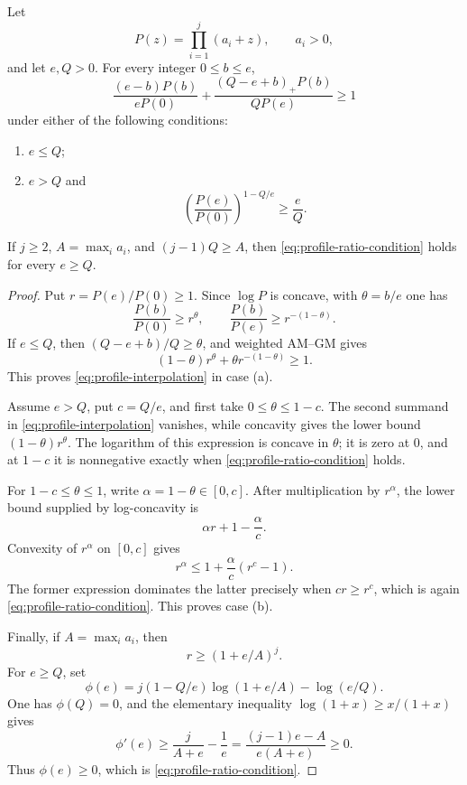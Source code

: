 \documentclass[11pt,a4paper]{amsart}
\numberwithin{equation}{section}
\theoremstyle{remark}
\begin{document}
\begin{lemma}
\label{lem:codim-one-profile-interpolation}
Let
\[
 P(z)=\prod_{i=1}^{j}(a_i+z),\qquad a_i>0,
\]
and let \(e,Q>0\).  For every integer \(0\le b\le e\),
\begin{equation}
 \frac{(e-b)P(b)}{eP(0)}+
 \frac{(Q-e+b)_+P(b)}{QP(e)}\ge1
 \label{eq:profile-interpolation}
\end{equation}
under either of the following conditions:
\begin{enumerate}[label=\textup{(\alph*)},leftmargin=*]
\item \(e\le Q\);
\item \(e>Q\) and
\begin{equation}
 \left(\frac{P(e)}{P(0)}\right)^{1-Q/e}\ge\frac eQ.
 \label{eq:profile-ratio-condition}
\end{equation}
\end{enumerate}
If \(j\ge2\), \(A=\max_i a_i\), and \((j-1)Q\ge A\), then
\eqref{eq:profile-ratio-condition} holds for every \(e\ge Q\).
\end{lemma}

\begin{proof}
Put \(r=P(e)/P(0)\ge1\).  Since \(\log P\) is concave, with
\(\theta=b/e\) one has
\[
 \frac{P(b)}{P(0)}\ge r^\theta,
 \qquad
 \frac{P(b)}{P(e)}\ge r^{-(1-\theta)}.
\]
If \(e\le Q\), then \((Q-e+b)/Q\ge\theta\), and weighted AM--GM gives
\[
 (1-\theta)r^\theta+\theta r^{-(1-\theta)}\ge1.
\]
This proves \eqref{eq:profile-interpolation} in case \textup{(a)}.

Assume \(e>Q\), put \(c=Q/e\), and first take
\(0\le\theta\le1-c\).  The second summand in
\eqref{eq:profile-interpolation} vanishes, while concavity gives the lower
bound \((1-\theta)r^\theta\).  The logarithm of this expression is
concave in \(\theta\); it is zero at \(0\), and at \(1-c\) it is
nonnegative exactly when \eqref{eq:profile-ratio-condition} holds.

For \(1-c\le\theta\le1\), write \(\alpha=1-\theta\in[0,c]\).  After
multiplication by \(r^\alpha\), the lower bound supplied by log-concavity
is
\[
 \alpha r+1-\frac\alpha c.
\]
Convexity of \(r^\alpha\) on \([0,c]\) gives
\[
 r^\alpha\le1+\frac\alpha c(r^c-1).
\]
The former expression dominates the latter precisely when
\(cr\ge r^c\), which is again
\eqref{eq:profile-ratio-condition}.  This proves case \textup{(b)}.

Finally, if \(A=\max_i a_i\), then
\[
 r\ge(1+e/A)^j.
\]
For \(e\ge Q\), set
\[
 \phi(e)=j(1-Q/e)\log(1+e/A)-\log(e/Q).
\]
One has \(\phi(Q)=0\), and the elementary inequality
\(\log(1+x)\ge x/(1+x)\) gives
\[
 \phi'(e)\ge \frac{j}{A+e}-\frac1e
 =\frac{(j-1)e-A}{e(A+e)}\ge0.
\]
Thus \(\phi(e)\ge0\), which is
\eqref{eq:profile-ratio-condition}.
\end{proof}
\end{document}
